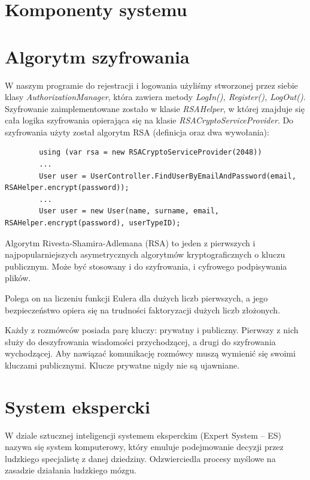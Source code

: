 \documentclass[12pt,a4paper]{article}
\begin{document}
\section*{Komponenty systemu}


	
\section*{Algorytm szyfrowania}
	
	
	W naszym programie do rejestracji i logowania użyliśmy stworzonej przez siebie klasy \emph{AuthorizationManager}, która zawiera metody \emph{LogIn(), Register(), LogOut()}.
	Szyfrowanie zaimplementowane zostało w klasie \emph{RSAHelper}, w której znajduje się cała logika szyfrowania opierająca się na klasie \emph{RSACryptoServiceProvider}.
	Do szyfrowania użyty został algorytm RSA (definicja oraz dwa wywołania):
	\begin{lstlisting}
		using (var rsa = new RSACryptoServiceProvider(2048))
		...
		User user = UserController.FindUserByEmailAndPassword(email, RSAHelper.encrypt(password));
		...
		User user = new User(name, surname, email, RSAHelper.encrypt(password), userTypeID);
	\end{lstlisting}

	



	Algorytm Rivesta-Shamira-Adlemana (RSA) to jeden z pierwszych i najpopularniejszych asymetrycznych algorytmów kryptograficznych o kluczu publicznym. Może być stosowany i do szyfrowania, i cyfrowego podpisywania plików.
	
	\smallskip
	Polega on na liczeniu funkcji Eulera dla dużych liczb pierwszych, a jego bezpieczeństwo opiera się na trudności faktoryzacji dużych liczb złożonych.
	
	\smallskip
	Każdy z rozmówców posiada parę kluczy: prywatny i publiczny. Pierwszy z nich służy do deszyfrowania wiadomości przychodzącej, a drugi do szyfrowania wychodzącej. Aby nawiązać komunikację rozmówcy muszą wymienić się swoimi kluczami publicznymi. Klucze prywatne nigdy nie są ujawniane.
	
	
\section*{System ekspercki}

	W dziale sztucznej inteligencji systemem eksperckim (Expert System -- ES) nazywa się system komputerowy, który emuluje podejmowanie decyzji przez ludzkiego specjalistę z danej dziedziny. Odzwierciedla procesy myślowe na zasadzie działania ludzkiego mózgu.
	
\end{document}
